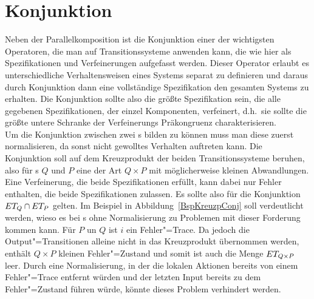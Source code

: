 \section{Konjunktion}

Neben der Parallelkomposition ist die Konjunktion einer der wichtigsten
Operatoren, die man auf Transitionssysteme anwenden kann, die wie hier als
Spezifikationen und Verfeinerungen aufgefasst werden. Dieser Operator erlaubt
es unterschiedliche Verhaltensweisen eines Systems separat zu definieren und
daraus durch Konjunktion dann eine vollständige Spezifikation den gesamten
Systems zu erhalten. Die Konjunktion sollte also die größte Spezifikation sein,
die alle gegebenen Spezifikationen, der einzel Komponenten, verfeinert, d.h.\
sie sollte die größte untere Schranke der Verfeinerungs Präkongruenz
charakterisieren.\\
Um die Konjunktion zwischen zwei \MEIO{}s bilden zu können muss man diese
zuerst normalisieren, da sonst nicht gewolltes Verhalten auftreten kann. Die
Konjunktion soll auf dem Kreuzprodukt der beiden Transitionssysteme beruhen,
also für \MEIO{}s $Q$ und $P$ eine \MEIO{} der Art $Q\times P$ mit
möglicherweise kleinen Abwandlungen. Eine Verfeinerung, die beide
Spezifikationen erfüllt, kann dabei nur Fehler enthalten, die beide
Spezifikationen zulassen. Es sollte also für die Konjunktion $ET _Q\cap ET
_P$ gelten. Im Beispiel in Abbildung~\ref{BspKreuzpConj} soll verdeutlicht
werden, wieso es bei \MEIO{}s ohne Normalisierung zu Problemen mit dieser
Forderung kommen kann. Für $P$ un $Q$ ist $i$ ein Fehler"=Trace. Da jedoch die
Output"=Transitionen alleine nicht in das Kreuzprodukt übernommen werden,
enthält $Q\times P$ kleinen Fehler"=Zustand und somit ist auch die Menge $ET
_{Q\times P}$ leer. Durch eine Normalisierung, in der die lokalen Aktionen
bereits von einem Fehler"=Trace entfernt würden und der letzten Input bereits
zu dem Fehler"=Zustand führen würde, könnte dieses Problem verhindert werden.

